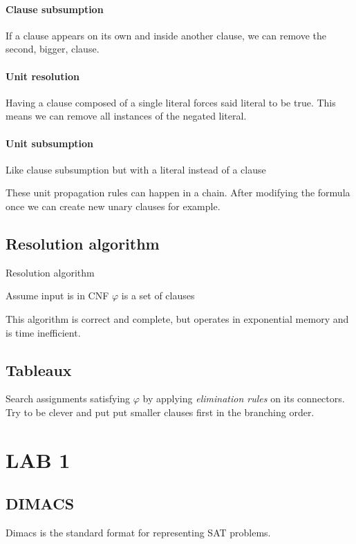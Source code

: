 \documentclass{article}
\begin{document}
\paragraph{Clause subsumption}
If a clause appears on its own and inside another clause, we can remove the second, bigger, clause.

\paragraph{Unit resolution}
Having a clause composed of a single literal forces said literal to be true. This means we can remove all instances of the negated literal.

\paragraph{Unit subsumption}
Like clause subsumption but with a literal instead of a clause

These unit propagation rules can happen in a chain. After modifying the formula once we can create new unary clauses for example.

\subsection{Resolution algorithm}
\begin{algorithm}
    \caption{Resolution algorithm}
    Assume input is in CNF\;
    $\varphi$ is a set of clauses\;
    \;
\end{algorithm}
This algorithm is correct and complete, but operates in exponential memory and is time inefficient.

\subsection{Tableaux}
Search assignments satisfying $\varphi$ by applying \textit{elimination rules} on its connectors.\\
Try to be clever and put put smaller clauses first in the branching order.

\section{LAB 1}
\subsection{DIMACS}
Dimacs is the standard format for representing SAT problems.
\end{document}

